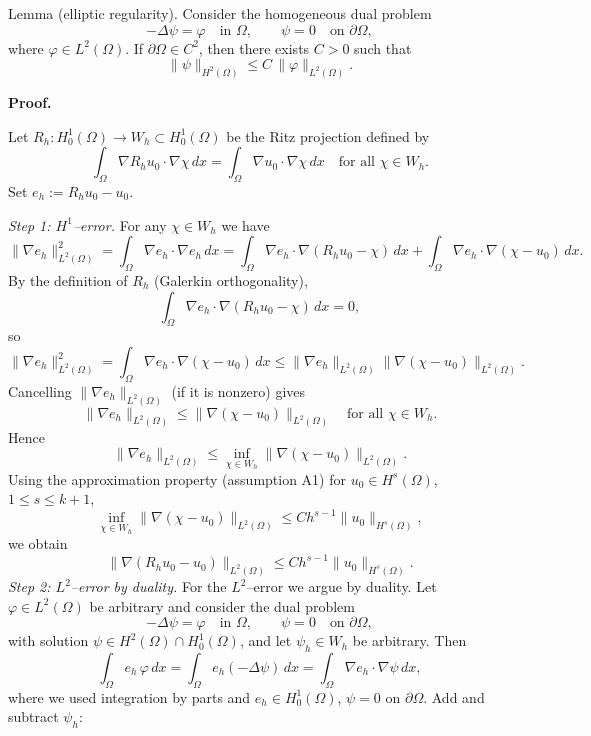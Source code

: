 Lemma (elliptic regularity). Consider the homogeneous dual problem
\[
    -\Delta \psi = \varphi \quad \text{in } \Omega,
    \qquad \psi = 0 \quad \text{on } \partial\Omega,
\]
where $\varphi \in L^2(\Omega)$. If $\partial\Omega \in C^2$, then there exists
$C>0$ such that
\[
    \|\psi\|_{H^2(\Omega)} \le C \,\|\varphi\|_{L^2(\Omega)}.
    \tag{ER}
\]

\textbf{Proof.}

Let $R_h : H_0^1(\Omega) \to W_h \subset H_0^1(\Omega)$ be the Ritz
projection defined by
\[
    \int_\Omega \nabla R_h u_0 \cdot \nabla \chi \, dx
    =
    \int_\Omega \nabla u_0 \cdot \nabla \chi \, dx
    \quad \text{for all } \chi \in W_h.
\]
Set $e_h := R_h u_0 - u_0$.

\emph{Step 1: $H^1$--error.}
For any $\chi \in W_h$ we have
\[
    \|\nabla e_h\|_{L^2(\Omega)}^2
    =
    \int_\Omega \nabla e_h \cdot \nabla e_h \, dx
    =
    \int_\Omega \nabla e_h \cdot \nabla(R_h u_0 - \chi) \, dx
    +
    \int_\Omega \nabla e_h \cdot \nabla(\chi - u_0) \, dx.
\]
By the definition of $R_h$ (Galerkin orthogonality),
\[
    \int_\Omega \nabla e_h \cdot \nabla(R_h u_0 - \chi) \, dx = 0,
\]
so
\[
    \|\nabla e_h\|_{L^2(\Omega)}^2
    =
    \int_\Omega \nabla e_h \cdot \nabla(\chi - u_0) \, dx \le \|\nabla e_h\|_{L^2(\Omega)} \|\nabla(\chi - u_0)\|_{L^2(\Omega)}.
\]
Cancelling $\|\nabla e_h\|_{L^2(\Omega)}$ (if it is nonzero) gives
\[
    \|\nabla e_h\|_{L^2(\Omega)} \le \|\nabla(\chi - u_0)\|_{L^2(\Omega)} \quad \text{for all } \chi \in W_h.
\]
Hence
\[
    \|\nabla e_h\|_{L^2(\Omega)} \le \inf_{\chi \in W_h} \|\nabla(\chi - u_0)\|_{L^2(\Omega)}.
\]
Using the approximation property (assumption A1) for $u_0 \in H^s(\Omega)$,
$1 \le s \le k+1$,
\[
    \inf_{\chi \in W_h}
    \|\nabla(\chi - u_0)\|_{L^2(\Omega)}
    \le
    C h^{s-1} \|u_0\|_{H^s(\Omega)},
\]
we obtain
\[
    \|\nabla (R_h u_0 - u_0)\|_{L^2(\Omega)}
    \le
    C h^{s-1} \|u_0\|_{H^s(\Omega)}.
    \tag{H1-error}
\]
\emph{Step 2: $L^2$--error by duality.}
For the $L^2$--error we argue by duality. Let $\varphi \in L^2(\Omega)$ be
arbitrary and consider the dual problem
\[
    -\Delta \psi = \varphi \quad \text{in } \Omega,
    \qquad \psi = 0 \quad \text{on } \partial\Omega,
\]
with solution $\psi \in H^2(\Omega) \cap H_0^1(\Omega)$, and let
$\psi_h \in W_h$ be arbitrary. Then
\[
    \int_\Omega e_h \,\varphi \, dx
    =
    \int_\Omega e_h (-\Delta \psi)\, dx
    =
    \int_\Omega \nabla e_h \cdot \nabla \psi \, dx,
\]
where we used integration by parts and $e_h\in H_0^1(\Omega)$, $\psi=0$ on
$\partial\Omega$. Add and subtract $\psi_h$:
